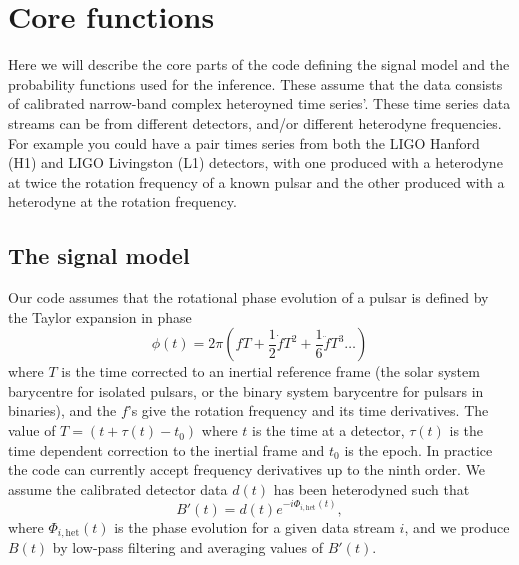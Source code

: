 \section{Core functions}

Here we will describe the core parts of the code defining the signal model and the probability functions used
for the inference. These assume that the data consists of calibrated narrow-band complex heteroyned time
series'. These time series data streams can be from different detectors, and/or different heterodyne
frequencies. For example you could have a pair times series from both the LIGO Hanford (H1) and LIGO
Livingston (L1) detectors, with one produced with a heterodyne at twice the rotation frequency of a known
pulsar and the other produced with a heterodyne at the rotation frequency.

\subsection{The signal model}\label{sec:model}

Our code assumes that the rotational phase evolution of a pulsar is defined by the Taylor expansion in phase
\begin{equation}
\phi(t) = 2\pi\left(fT + \frac{1}{2}\dot{f}T^2 + \frac{1}{6}\ddot{f}T^3  \ldots\right)
\end{equation}
where $T$ is the time corrected to an inertial reference frame (the solar system barycentre
for isolated pulsars, or the binary system barycentre for pulsars in binaries), and the $f$'s give
the rotation frequency and its time derivatives. The value of $T = (t+\tau(t)-t_0)$ where $t$ is the
time at a detector, $\tau(t)$ is the time dependent correction to the inertial frame and $t_0$ is the epoch.
In practice the code can currently accept frequency derivatives up to the ninth order. We assume the
calibrated detector data $d(t)$ has been heterodyned such that
\begin{equation}
B'(t) = d(t)e^{-i\Phi_{i,\textrm{het}}(t)},
\end{equation}
where $\Phi_{i,\textrm{het}}(t)$ is the phase evolution for a given data stream $i$, and we produce $B(t)$ by
low-pass filtering and averaging values of $B'(t)$.

